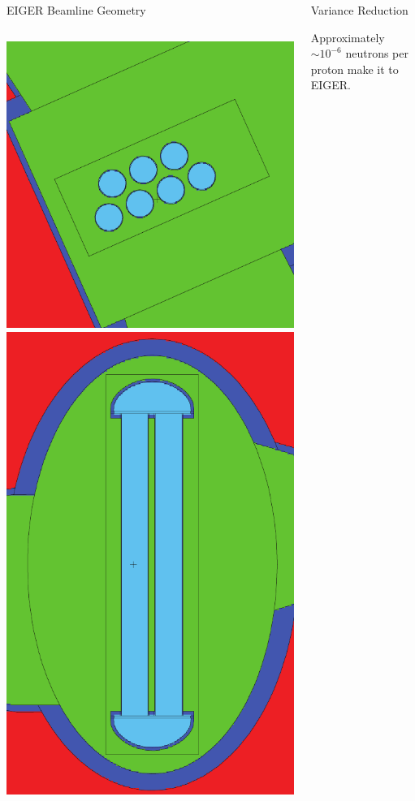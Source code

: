 \documentclass[final,t]{beamer}
\begin{document}
\begin{frame}{}
\begin{columns}[t]
\begin{column}{.3\linewidth}
\begin{block}{EIGER Beamline Geometry}
\begin{columns}[T]
\begin{column}{.25\linewidth}
          \begin{center}
          \includegraphics*[width=.5\linewidth]{wsgeom_xy.pdf} \quad \includegraphics*[width=.31\linewidth]{wsgeom_yz.pdf} 
          \end{center}

        \end{column}
      \end{columns}
      
      \end{block}


      \end{column}



    \begin{column}{.3\linewidth}

      \begin{block}{Variance Reduction}
      \vspace{-2ex}
      \begin{center} Approximately $\sim 10^{-6}$ neutrons per proton make it to EIGER. \end{center}


\end{block}
\end{column}
\end{columns}
\end{frame}
\end{document}

